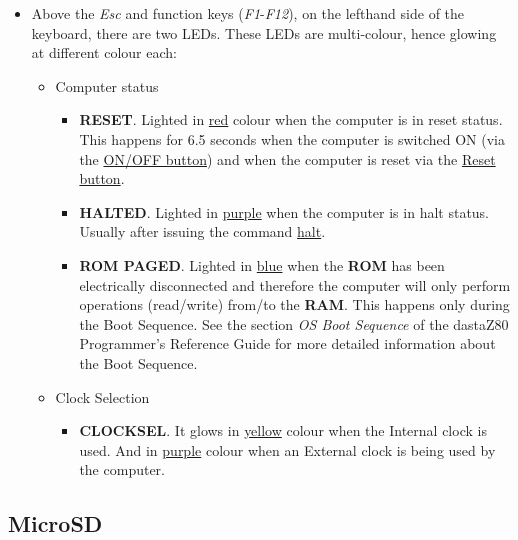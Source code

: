     \begin{itemize}
        \item Above the \textit{Esc} and function keys (\textit{F1}-\textit{F12}),
        on the lefthand side of the keyboard, there are two LEDs. These LEDs are
        multi-colour, hence glowing at different colour each:
        \begin{itemize}
            \item Computer status
            \begin{itemize}
                \item \textbf{RESET}. Lighted in \underline{red} colour when
                the computer is in reset status. This happens for 6.5 seconds
                when the computer is switched ON (via the
                \hyperref[subsec:onoffbutt]{ON/OFF button}) and when the
                computer is reset via the \hyperref[subsec:resetbutton]
                {Reset button}.
                \item \textbf{HALTED}. Lighted in \underline{purple} when the
                computer is in halt status. Usually after issuing the command
                \hyperref[cmd:halt]{halt}.
                \item \textbf{ROM PAGED}. Lighted in \underline{blue} when the
                \textbf{ROM} has been electrically disconnected and therefore
                the computer will only perform operations (read/write) from/to
                the \textbf{RAM}. This happens only during the Boot Sequence.
                See the section \textit{OS Boot Sequence} of the dastaZ80
                Programmer's Reference Guide\cite{dastaz80progref} for more
                detailed information about the Boot Sequence.
            \end{itemize}
            \item Clock Selection
            \begin{itemize}
                \item \textbf{CLOCKSEL}. It glows in \underline{yellow} colour
                when the Internal clock is used. And in \underline{purple}
                colour when an External clock is being used by the computer.
            \end{itemize}
        \end{itemize}
    \end{itemize}

    \subsection{MicroSD}


